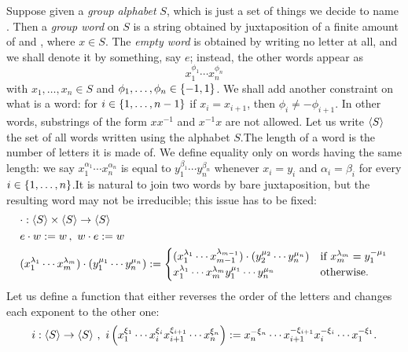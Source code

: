 \begin{example}\label{example:FreeGroup}
  Suppose given a {\em group alphabet} \(S\), which is just a set of
  things we decide to name . Then a {\em group word} on \(S\)
  is a string obtained by juxtaposition of a finite amount of
   and , where \(x \in S\). The {\em empty word}
  is obtained by writing no letter at all, and we shall denote it by
  something, say \(e\); instead, the other words appear as
  \[
    x_1^{\phi_1} \cdots{} x_n^{\phi_n}
  \]
  with \(x_1, \dots{}, x_n \in S\) and
  \(\phi_1, \dots{}, \phi_n \in \left\{-1, 1\right\}\). We shall add another constraint
  on what is a word: for \(i \in \left\{1, \dots{}, n-1\right\}\) if
  \(x_i = x_{i+1}\), then \(\phi_i \ne - \phi_{i+1}\). In other words,
  substrings of the form \(xx^{-1}\) and \(x^{-1}x\) are not
  allowed. Let us write \(\left\langle S\right\rangle\) the set of all words written using
  the alphabet \(S\).\newline The length of a word is the number of letters it
  is made of. We define equality only on words having the same length:
  we say \(x_1^{\alpha_1} \cdots{} x_n^{\alpha_n}\) is equal to
  \(y_1^{\beta_1} \cdots{} y_n^{\beta_n}\) whenever \(x_i = y_i\) and
  \(\alpha_i = \beta_i\) for every
  \(i \in \left\{1, \dots{}, n\right\}\).\newline It is natural to join two words by bare
  juxtaposition, but the resulting word may not be irreducible; this
  issue has to be fixed:
  \begin{align*}
    & \cdot : \left\langle S\right\rangle \times \left\langle S\right\rangle \to \left\langle S\right\rangle \\
    & e \cdot w := w \,, \ w \cdot e := w \\
    & (x_1^{\lambda_1} \cdots x_m^{\lambda_m}) \cdot (y_1^{\mu_1} \cdots y_n^{\mu_n}) :=
      \begin{cases}
        (x_1^{\lambda_1} \cdots x_{m-1}^{\lambda_{m-1}}) \cdot (y_2^{\mu_2} \cdots y_n^{\mu_n}) & \text{if } x_{m}^{\lambda_m} = y_1^{-\mu_1} \\
        x_1^{\lambda_1} \cdots x_m^{\lambda_m} y_1^{\mu_1} \cdots y_n^{\mu_n} & \text{otherwise.}
      \end{cases}
  \end{align*}
  Let us define a function that either reverses the order of the letters
  and changes each exponent to the other one:
  \[
    i : \left\langle S\right\rangle \to \left\langle S\right\rangle \,, \ i\left( x_1^{\xi_1} \cdots{} x_i^{\xi_i}
      x_{i+1}^{\xi_{i+1}} \cdots{} x_n^{\xi_n} \right) := x_n^{-\xi_n} \cdots{}
    x_{i+1}^{-\xi_{i+1}} x_i^{-\xi_i} \cdots{} x_1^{-\xi_1} .
\]
\end{example}
